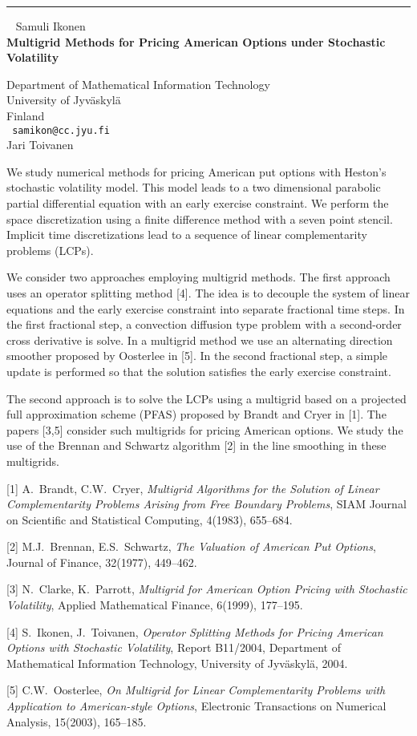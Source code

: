 \documentclass{report}
\begin{document}
\begin{center}

\rule{6in}{1pt} \
{\large
Samuli Ikonen
\\ {\bf
Multigrid Methods for Pricing American Options under Stochastic
Volatility
}}

Department of Mathematical Information Technology \\
University of Jyv\"{a}skyl\"{a} \\
Finland
\\ {\tt
samikon@cc.jyu.fi
}
\\
Jari Toivanen
\end{center}

We study numerical methods for pricing American put options with
Heston's stochastic volatility model. This model leads to a two
dimensional parabolic partial differential equation with an early
exercise constraint. We perform the space discretization using a finite
difference method with a seven point stencil. Implicit time
discretizations lead to a sequence of linear complementarity problems
(LCPs).

We consider two approaches employing multigrid methods. The first
approach uses an operator splitting method [4]. The idea is to decouple
the system of linear equations and the early exercise constraint into
separate fractional time steps. In the first fractional step, a
convection diffusion type problem with a second-order cross derivative
is solve. In a multigrid method we use an alternating direction
smoother proposed by Oosterlee in [5]. In the second fractional step, a
simple update is performed so that the solution satisfies the early
exercise constraint.

The second approach is to solve the LCPs using a multigrid based on a
projected full approximation scheme (PFAS) proposed by Brandt and Cryer
in [1]. The papers [3,5] consider such multigrids for pricing American
options. We study the use of the Brennan and Schwartz algorithm [2] in
the line smoothing in these multigrids.

[1] A.~Brandt, C.W.~Cryer,
{\em Multigrid Algorithms for the Solution of
Linear Complementarity Problems Arising from Free Boundary Problems},
SIAM Journal on Scientific and Statistical Computing, 4(1983), 655--684.

[2] M.J.~Brennan, E.S.~Schwartz,
{\em The Valuation of American Put Options},
Journal of Finance, 32(1977), 449--462.

[3] N.~Clarke, K.~Parrott,
{\em Multigrid for American Option Pricing with
Stochastic Volatility}, Applied Mathematical Finance, 6(1999), 177--195.

[4] S.~Ikonen, J.~Toivanen,
{\em Operator Splitting Methods for Pricing
American Options with Stochastic Volatility}, Report B11/2004,
Department of Mathematical Information Technology, University of
Jyv\"{a}skyl\"{a}, 2004.

[5] C.W.~Oosterlee,
{\em On Multigrid for Linear Complementarity Problems
with Application to American-style Options}, Electronic Transactions on
Numerical Analysis, 15(2003), 165--185.
\end{document}
